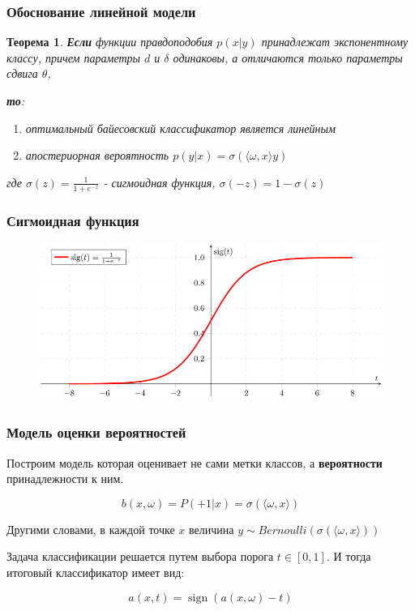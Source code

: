 \documentclass{beamer}
\newtheorem{rustheorem}{Теорема}
\DeclareMathOperator{\sign}{sign}
\begin{document}
	\begin{frame}
		\frametitle{Обоснование линейной модели}
		
		\begin{rustheorem}
		\textbf{Если} функции правдоподобия $p(x | y) $ принадлежат экспонентному классу, причем параметры $d$ и $\delta$ одинаковы, а отличаются только параметры сдвига $\theta$, 
		
		\textbf{то}:
		\begin{enumerate}
			\item оптимальный байесовский классификатор является линейным%
			\item апостериорная вероятность $p(y | x) = \sigma(\langle \omega, x \rangle y)$
		\end{enumerate}
		
		где $\sigma(z) = \frac{1}{1 + e^{-z}}$ - сигмоидная функция, $\sigma(-z) = 1 - \sigma(z)$
		\end{rustheorem}	
	\end{frame}
	
	\begin{frame}
		\frametitle{Сигмоидная функция}
		
		\begin{figure}
			\centering
			\includegraphics[width=1\textwidth]{img/sigmoida}
		\end{figure}
	\end{frame}
	
	\begin{frame}
		\frametitle{Модель оценки вероятностей}
		Построим модель которая оценивает не сами метки классов, а \textbf{вероятности} принадлежности к ним.
		
		\[
		b(x, \omega) = P(+1 | x) = \sigma(\langle \omega, x \rangle)
		\]
		
		Другими словами, в каждой точке $x$ величина $y \sim Bernoulli(\sigma(\langle \omega, x \rangle))$
		
		\vspace{15pt}
		
		Задача классификации решается путем выбора порога $t \in [0, 1]$. И тогда итоговый классификатор имеет вид:
		
		\[
		a(x, t) = \sign (a(x, \omega) - t)
		\]
		
	\end{frame}
	
\end{document}
